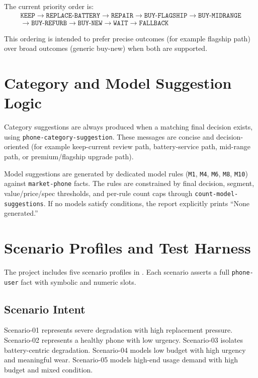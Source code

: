 \documentclass[11pt]{article}
\newcommand{\filepath}[1]{\path{#1}}
\begin{document}
The current priority order is:
\[
\begin{aligned}
\texttt{KEEP} \rightarrow \texttt{REPLACE-BATTERY} \rightarrow \texttt{REPAIR} \rightarrow \texttt{BUY-FLAGSHIP} \rightarrow \texttt{BUY-MIDRANGE} \\
\rightarrow \texttt{BUY-REFURB} \rightarrow \texttt{BUY-NEW} \rightarrow \texttt{WAIT} \rightarrow \texttt{FALLBACK}
\end{aligned}
\]

This ordering is intended to prefer precise outcomes (for example flagship path) over broad outcomes (generic buy-new) when both are supported.

\section{Category and Model Suggestion Logic}
Category suggestions are always produced when a matching final decision exists, using \texttt{phone-category-suggestion}. These messages are concise and decision-oriented (for example keep-current review path, battery-service path, mid-range path, or premium/flagship upgrade path).

Model suggestions are generated by dedicated model rules (\texttt{M1}, \texttt{M4}, \texttt{M6}, \texttt{M8}, \texttt{M10}) against \texttt{market-phone} facts. The rules are constrained by final decision, segment, value/price/spec thresholds, and per-rule count caps through \texttt{count-model-suggestions}. If no models satisfy conditions, the report explicitly prints ``None generated.''

\section{Scenario Profiles and Test Harness}
The project includes five scenario profiles in \filepath{sample-scenarios.clp}. Each scenario asserts a full \texttt{phone-user} fact with symbolic and numeric slots.

\subsection{Scenario Intent}
Scenario-01 represents severe degradation with high replacement pressure. Scenario-02 represents a healthy phone with low urgency. Scenario-03 isolates battery-centric degradation. Scenario-04 models low budget with high urgency and meaningful wear. Scenario-05 models high-end usage demand with high budget and mixed condition.
\end{document}
